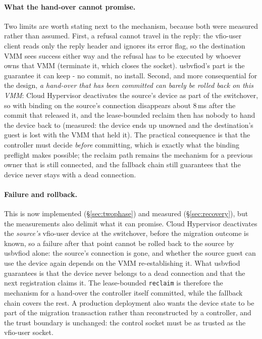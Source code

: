 \documentclass[10pt,conference]{IEEEtran}
\newcommand{\code}[1]{\texttt{#1}}
\begin{document}
\paragraph{What the hand-over cannot promise.}
Two limits are worth stating next to the mechanism, because both were measured
rather than assumed. First, a refusal cannot travel in the reply: the vfio-user
client reads only the reply header and ignores its error flag, so the
destination VMM sees success either way and the refusal has to be executed by
whoever owns that VMM (terminate it, which closes the socket). usbvfiod's part is
the guarantee it can keep - no commit, no install. Second, and more consequential
for the design, \emph{a hand-over that has been committed can barely be rolled
back on this VMM}: Cloud Hypervisor deactivates the source's device as part of
the switchover, so with binding on the source's connection disappears about
8\,ms after the commit that released it, and the lease-bounded reclaim then has
nobody to hand the device back to (measured: the device ends up unowned and the
destination's guest is lost with the VMM that held it). The practical
consequence is that the controller must decide \emph{before} committing, which is
exactly what the binding preflight makes possible; the reclaim path remains the
mechanism for a previous owner that is still connected, and the fallback chain
still guarantees that the device never stays with a dead connection.

\paragraph{Failure and rollback.}
This is now implemented (\S\ref{sec:twophase}) and measured
(\S\ref{sec:recovery}), but the measurements also delimit what it can promise.
Cloud Hypervisor deactivates the \emph{source's} vfio-user device at the
switchover, before the migration outcome is known, so a failure after that point
cannot be rolled back to the source by usbvfiod alone: the source's connection is
gone, and whether the source guest can use the device again depends on the VMM
re-establishing it. What usbvfiod guarantees is that the device never belongs to
a dead connection and that the next registration claims it. The lease-bounded
\code{reclaim} is therefore the mechanism for a hand-over the controller itself
committed, while the fallback chain covers the rest. A production deployment also
wants the device state to be part of the migration transaction rather than
reconstructed by a controller, and the trust boundary is unchanged: the control
socket must be as trusted as the vfio-user socket.
\end{document}
